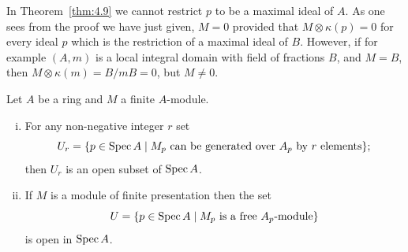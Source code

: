 \begin{remark}
In Theorem~\ref{thm:4.9} we cannot restrict $p$ to be a maximal ideal of
$A$. As one sees from the proof we have just given, $M = 0$ provided that
$M \otimes \kappa(p) = 0$ for every ideal $p$ which is the restriction of a maximal ideal
of $B$. However, if for example $(A, m)$ is a local integral domain with field
of fractions $B$, and $M = B$, then $M \otimes \kappa(m) = B/mB = 0$, but $M \neq 0$.
\end{remark}

\begin{theorem}\label{thm:4.10}
Let $A$ be a ring and $M$ a finite $A$-module.
\begin{enumerate}[(i)]
  \item For any non-negative integer $r$ set
        \[
          U_r = \{p \in \operatorname{Spec} A \mid M_p \text{ can be generated over } A_p \text{ by } r \text{ elements}\};
        \]
        then $U_r$ is an open subset of $\operatorname{Spec} A$.
  \item If $M$ is a module of finite presentation then the set
        \[
          U = \{p \in \operatorname{Spec} A \mid M_p \text{ is a free } A_p\text{-module}\}
        \]
        is open in $\operatorname{Spec} A$.
\end{enumerate}
\end{theorem}

